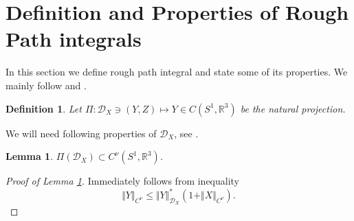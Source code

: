 \documentclass[11pt,a4paper,leqno]{amsart}%
\theoremstyle{plain}
\theoremstyle{remark}
\newtheorem{example}[theorem]{Example}
\theoremstyle{plain}
\newtheorem{lemma}[theorem]{Lemma}
\newtheorem{definition}[theorem]{Definition}
\numberwithin{equation}{section}
\def\Rnu{{\mathbb R}}
\begin{document}
\section{Definition and Properties of Rough Path integrals}
In this section we define rough path integral and state some of
its properties. We mainly follow \cite{[Gubinelli-2004]} and
\cite{[Bess+Gub_2005]}.


\begin{definition}
Let $\Pi:\mathcal{D}_X\ni (Y,Z)\mapsto Y\in C(S^1,\Rnu^3)$ be the
natural projection.
\end{definition}
We will need following properties of $\mathcal{D}_X$, see
\cite{[Gubinelli-2004]}.
\begin{lemma}\label{lem:HolderProp}
$\Pi(\mathcal{D}_X)\subset C^{\nu}(S^1,\Rnu^3)$.
\end{lemma}
\begin{proof}[ Proof of Lemma \ref{lem:HolderProp}]
Immediately follows from inequality
\begin{equation}
\Vert Y\Vert_{C^{\nu}}\leq
\Vert Y\Vert_{\mathcal{D}_X}^*(1+\Vert X\Vert_{C^{\nu}}).\label{eqn:HolderIneq}
\end{equation}
\end{proof}
\end{document}
